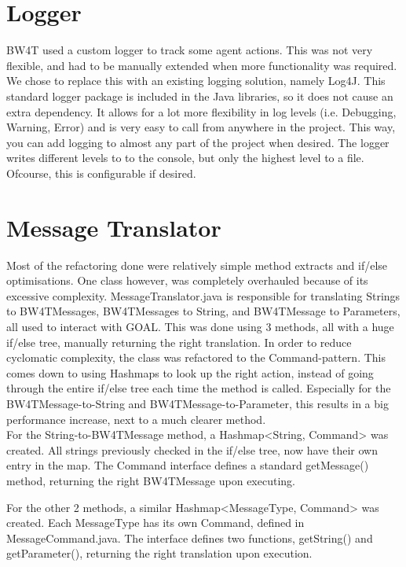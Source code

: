 \section{Logger}
BW4T used a custom logger to track some agent actions. This was not very flexible, and had to be manually extended when more functionality was required. We chose to replace this with an existing logging solution, namely Log4J. This standard logger package is included in the Java libraries, so it does not cause an extra dependency. It allows for a lot more flexibility in log levels (i.e. Debugging, Warning, Error) and is very easy to call from anywhere in the project. This way, you can add logging to almost any part of the project when desired. The logger writes different levels to to the console, but only the highest level to a file. Ofcourse, this is configurable if desired. 

\section{Message Translator}
Most of the refactoring done were relatively simple method extracts and if/else optimisations. One class however, was completely overhauled because of its excessive complexity. MessageTranslator.java is responsible for translating Strings to BW4TMessages, BW4TMessages to String, and BW4TMessage to Parameters, all used to interact with GOAL. This was done using 3 methods, all with a huge if/else tree, manually returning the right translation. In order to reduce cyclomatic complexity, the class was refactored to the Command-pattern. This comes down to using Hashmaps to look up the right action, instead of going through the entire if/else tree each time the method is called. Especially for the BW4TMessage-to-String and BW4TMessage-to-Parameter, this results in a big performance increase, next to a much clearer method. \\

For the String-to-BW4TMessage method, a Hashmap<String, Command> was created. All strings previously checked in the if/else tree, now have their own entry in the map. The Command interface defines a standard getMessage() method, returning the right BW4TMessage upon executing. 

For the other 2 methods, a similar Hashmap<MessageType, Command> was created. Each MessageType has its own Command, defined in MessageCommand.java. The interface defines two functions, getString() and getParameter(), returning the right translation upon execution. 

